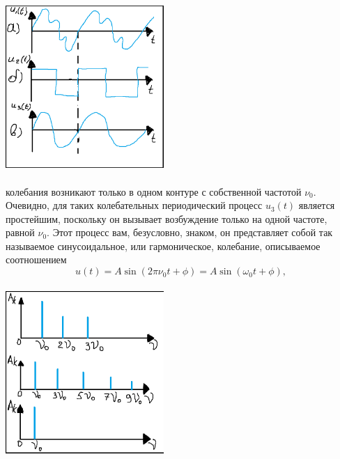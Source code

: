 \documentclass[main.tex]{subfiles}
\begin{document}
\begin{multicols}{2}

\includegraphics[width=6cm, height=6.2cm ]{images/pic1.png}\\
\\

\noindent колебания возникают только в одном контуре с собственной частотой $\nu_0$. Очевидно, для таких колебательных периодический процесс $u_3(t)$ является простейшим, поскольку он вызывает возбуждение только на одной частоте, равной $\nu_0$. Этот процесс вам, безусловно, знаком, он представляет собой так называемое синусоидальное, или гармоническое, колебание, описываемое соотношением \[u(t) = A\sin({2\pi\nu_0t + \phi}) = A\sin({\omega_0t + \phi}),\]\\

\includegraphics[width=6cm, height=6.2cm ]{images/pic2.png}\\


\end{multicols}
\end{document}
